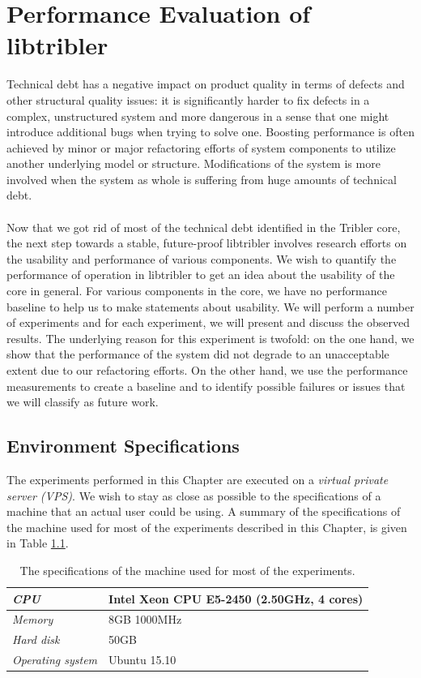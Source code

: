 \chapter{Performance Evaluation of libtribler}
\label{chapter:experiments}

Technical debt has a negative impact on product quality in terms of defects and other structural quality issues\cite{tom2013exploration}: it is significantly harder to fix defects in a complex, unstructured system and more dangerous in a sense that one might introduce additional bugs when trying to solve one. Boosting performance is often achieved by minor or major refactoring efforts of system components to utilize another underlying model or structure. Modifications of the system is more involved when the system as whole is suffering from huge amounts of technical debt.\\\\
Now that we got rid of most of the technical debt identified in the Tribler core, the next step towards a stable, future-proof libtribler involves research efforts on the usability and performance of various components. We wish to quantify the performance of operation in libtribler to get an idea about the usability of the core in general. For various components in the core, we have no performance baseline to help us to make statements about usability. We will perform a number of experiments and for each experiment, we will present and discuss the observed results. The underlying reason for this experiment is twofold: on the one hand, we show that the performance of the system did not degrade to an  unacceptable extent due to our refactoring efforts. On the other hand, we use the performance measurements to create a baseline and to identify possible failures or issues that we will classify as future work.

\section{Environment Specifications}
The experiments performed in this Chapter are executed on a \emph{virtual private server (VPS)}. We wish to stay as close as possible to the specifications of a machine that an actual user could be using. A summary of the specifications of the machine used for most of the experiments described in this Chapter, is given in Table \ref{table:experiments-server-specifications}.

\begin{table}[h!]
	\centering
	\begin{tabular}{|l|l|}
		\hline
		\emph{CPU} & Intel Xeon CPU E5-2450 (2.50GHz, 4 cores)\\ \hline
		\emph{Memory} & 8GB 1000MHz \\ \hline
		\emph{Hard disk} & 50GB \\ \hline
		\emph{Operating system} & Ubuntu 15.10 \\ \hline
	\end{tabular}
	\caption{The specifications of the machine used for most of the experiments.}
	\label{table:experiments-server-specifications}
\end{table}

